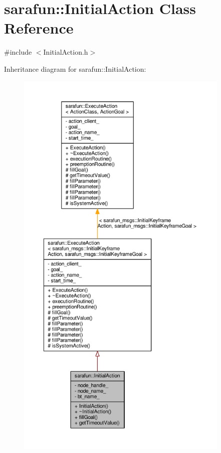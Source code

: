 \hypertarget{classsarafun_1_1InitialAction}{\section{sarafun\-:\-:Initial\-Action Class Reference}
\label{classsarafun_1_1InitialAction}
}


{\ttfamily \#include $<$Initial\-Action.\-h$>$}



Inheritance diagram for sarafun\-:\-:Initial\-Action\-:\nopagebreak
\begin{figure}[H]
\begin{center}
\leavevmode
\includegraphics[height=550pt]{d2/dd7/classsarafun_1_1InitialAction__inherit__graph}
\end{center}
\end{figure}


